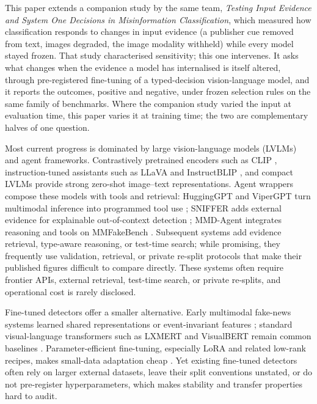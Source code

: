 \documentclass{article} %
\begin{document}
This paper extends a companion study by the same team, \emph{Testing Input Evidence and System One Decisions in Misinformation Classification}, which measured how classification responds to changes in input evidence (a publisher cue removed from text, images degraded, the image modality withheld) while every model stayed frozen. That study characterised sensitivity; this one intervenes. It asks what changes when the evidence a model has internalised is itself altered, through pre-registered fine-tuning of a typed-decision vision-language model, and it reports the outcomes, positive and negative, under frozen selection rules on the same family of benchmarks. Where the companion study varied the input at evaluation time, this paper varies it at training time; the two are complementary halves of one question.

Most current progress is dominated by large vision-language models (LVLMs) and agent frameworks. Contrastively pretrained encoders such as CLIP \citep{Radford2021LearningTransferable}, instruction-tuned assistants such as LLaVA and InstructBLIP \citep{Liu2023VisualInstruction, Dai2023InstructblipTowards}, and compact LVLMs \citep{Zhu2024LlavaphiEfficient} provide strong zero-shot image--text representations. Agent wrappers compose these models with tools and retrieval: HuggingGPT and ViperGPT turn multimodal inference into programmed tool use \citep{Shen2023HugginggptSolving, Surs2023VipergptVisual}; SNIFFER adds external evidence for explainable out-of-context detection \citep{Qi2024SnifferMultimodal}; MMD-Agent integrates reasoning and tools on MMFakeBench \citep{Liu2024MmfakebenchMixedsource}. Subsequent systems add evidence retrieval, type-aware reasoning, or test-time search; while promising, they frequently use validation, retrieval, or private re-split protocols that make their published figures difficult to compare directly. These systems often require frontier APIs, external retrieval, test-time search, or private re-splits, and operational cost is rarely disclosed.

Fine-tuned detectors offer a smaller alternative. Early multimodal fake-news systems learned shared representations or event-invariant features \citep{Khattar2019MvaeMultimodal, Wang2018EannEvent, Singhal2019SpotfakeMultimodal}; standard visual-language transformers such as LXMERT and VisualBERT remain common baselines \citep{Tan2019LxmertLearning, Li2019VisualbertSimple}. Parameter-efficient fine-tuning, especially LoRA and related low-rank recipes, makes small-data adaptation cheap \citep{Hu2021LoraLowrank, Kalajdzievski2023RankStabilization, Shuttleworth2024LoraVs}. Yet existing fine-tuned detectors often rely on larger external datasets, leave their split conventions unstated, or do not pre-register hyperparameters, which makes stability and transfer properties hard to audit.
\end{document}
